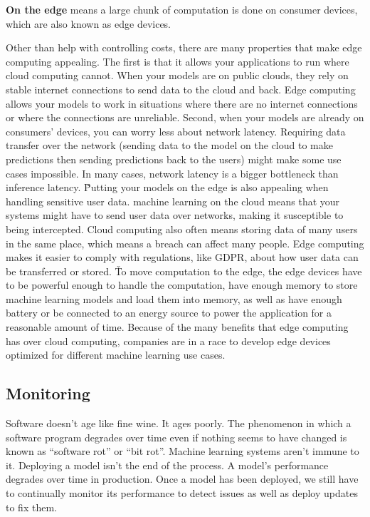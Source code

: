 \textbf{On the edge} means a large chunk of computation is done on consumer devices, which are also known as edge
devices.
\ed

Other than help with controlling costs, there are many properties that make edge computing appealing. The first is
that it allows your applications to run where cloud computing cannot. When your models are on public clouds, they
rely on stable internet connections to send data to the cloud and back. Edge computing allows your models to work in
situations where there are no internet connections or where the connections are unreliable. Second, when your models
are already on consumers' devices, you can worry less about network latency. Requiring data transfer over the network
(sending data to the model on the cloud to make predictions then sending predictions back to the users) might make
some use cases impossible. In many cases, network latency is a bigger bottleneck than inference latency. \v

Putting your models on the edge is also appealing when handling sensitive user data. machine learning on the cloud
means that your systems might have to send user data over networks, making it susceptible to being intercepted. Cloud
computing also often means storing data of many users in the same place, which means a breach can affect many people.
Edge computing makes it easier to comply with regulations, like GDPR, about how user data can be transferred or
stored. \v

To move computation to the edge, the edge devices have to be powerful enough to handle the computation, have enough
memory to store machine learning models and load them into memory, as well as have enough battery or be connected to
an energy source to power the application for a reasonable amount of time. Because of the many benefits that edge
computing has over cloud computing, companies are in a race to develop edge devices optimized for different machine
learning use cases.

\subsection{Monitoring}

Software doesn't age like fine wine. It ages poorly. The phenomenon in which a software program degrades over time
even if nothing seems to have changed is known as ``software rot'' or ``bit rot''. Machine learning systems aren't
immune to it. Deploying a model isn't the end of the process. A model's performance degrades over time in production.
Once a model has been deployed, we still have to continually monitor its performance to detect issues as well as
deploy updates to fix them.

